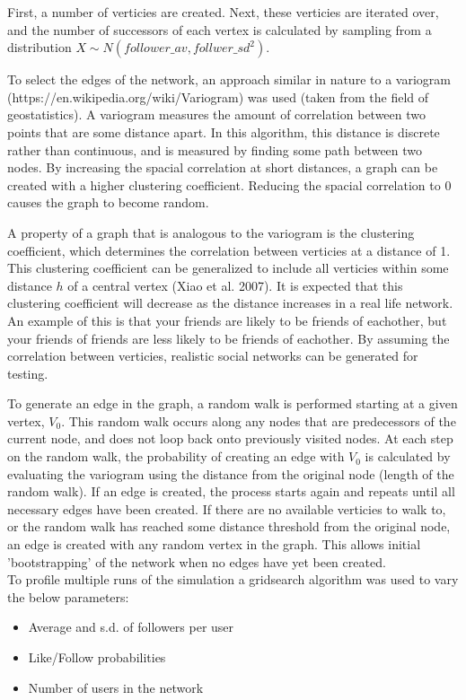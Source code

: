 \documentclass{article}
\begin{document}
First, a number of verticies are created.
Next, these verticies are iterated over, and the number of successors of each
vertex is calculated by sampling from a distribution $X \sim N\left(follower\_av, follwer\_sd^2\right)$.

To select the edges of the network, an approach similar in nature to a variogram
(https://en.wikipedia.org/wiki/Variogram) was used (taken from the field of geostatistics).
A variogram measures the amount of correlation between two points that are some distance apart.
In this algorithm, this distance is discrete rather than continuous, and is measured by finding
some path between two nodes. By increasing the spacial correlation at short distances,
a graph can be created with a higher clustering coefficient. Reducing the spacial correlation
to 0 causes the graph to become random.

A property of a graph that is analogous to the variogram is the clustering
coefficient, which determines the correlation between verticies at a distance of 1.
This clustering coefficient can be generalized to include all verticies
within some distance $h$ of a central vertex (Xiao et al. 2007).
It is expected that this clustering coefficient will decrease as the distance increases
in a real life network. An example of this is that your friends are likely to be friends of
eachother, but your friends of friends are less likely to be friends of eachother.
By assuming the correlation between verticies, realistic social networks can be generated
for testing.

To generate an edge in the graph, a random walk is performed starting at a given vertex, $V_0$.
This random walk occurs along any nodes that are predecessors of the current node,
and does not loop back onto previously visited nodes.
At each step on the random walk, the probability of creating an edge with $V_0$
is calculated by evaluating the variogram using the distance from the original node
(length of the random walk).
If an edge is created, the process
starts again and repeats until all necessary edges have been created.
If there are no available verticies to walk to,
or the random walk has reached some distance threshold from the original node,
an edge is created with any random vertex in the graph. This allows initial
'bootstrapping' of the network when no edges have yet been created.\\

To profile multiple runs of the simulation a gridsearch algorithm was used
to vary the below parameters:
\begin{itemize}
\item Average and s.d. of followers per user
\item Like/Follow probabilities
\item Number of users in the network
\end{itemize}
\end{document}
